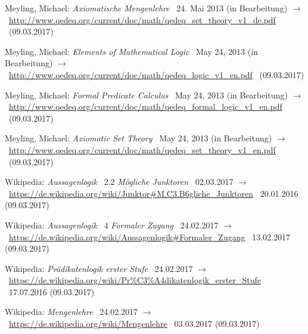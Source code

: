 \documentclass[english,ngerman,parskip=half,headsepline,footsepline]{scrreprt}
\begin{document}
\begin{flushleft}
\begin{thebibliography}{12}
			Meyling, Michael: \emph{Axiomatische Mengenlehre} \textendash\ 24. Mai 2013 (in Bearbeitung) $\rightarrow$~\url{http://www.qedeq.org/current/doc/math/qedeq_set_theory_v1_de.pdf} \textendash\ (09.03.2017)

			Meyling, Michael: \emph{Elements of Mathematical Logic} \textendash\ May 24, 2013 (in Bearbeitung) $\rightarrow$~\url{http://www.qedeq.org/current/doc/math/qedeq_logic_v1_en.pdf} \textendash\ (09.03.2017)

			Meyling, Michael: \emph{Formal Predicate Calculus} \textendash\ May 24, 2013 (in Bearbeitung) $\rightarrow$~\url{http://www.qedeq.org/current/doc/math/qedeq_formal_logic_v1_en.pdf} \textendash\ (09.03.2017)

			Meyling, Michael: \emph{Axiomatic Set Theory} \textendash\ May 24, 2013 (in Bearbeitung) $\rightarrow$~\url{http://www.qedeq.org/current/doc/math/qedeq_set_theory_v1_en.pdf} \textendash\ (09.03.2017)

			Wikipedia: \emph{Aussagenlogik} \chaptername~2.2 \emph{Mögliche Junktoren} \textendash\ 02.03.2017 $\rightarrow$~\url{https://de.wikipedia.org/wiki/Junktor#M.C3.B6gliche_Junktoren} \textendash\ 20.01.2016 (09.03.2017)

			Wikipedia: \emph{Aussagenlogik} \chaptername~4 \emph{Formaler Zugang} \textendash\ 24.02.2017 $\rightarrow$~\url{https://de.wikipedia.org/wiki/Aussagenlogik#Formaler_Zugang} \textendash\ 13.02.2017 (09.03.2017)

			Wikipedia: \emph{Prädikatenlogik erster Stufe} \textendash\ 24.02.2017 $\rightarrow$~\url{https://de.wikipedia.org/wiki/Pr%C3%A4dikatenlogik_erster_Stufe} \textendash\ 17.07.2016 (09.03.2017)

			Wikipedia: \emph{Mengenlehre} \textendash\ 24.02.2017 $\rightarrow$~\url{https://de.wikipedia.org/wiki/Mengenlehre} \textendash\ 03.03.2017 (09.03.2017)

		\end{thebibliography}
	\end{flushleft}
	\thispagestyle{scrheadings}
\end{document}
